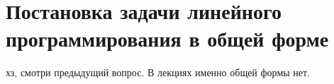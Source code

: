 \documentclass[17pt]{extarticle}
\begin{document}
\section{Постановка задачи линейного программирования в общей форме}
хз, смотри предыдущий вопрос. В лекциях именно общей формы нет.
\end{document}

